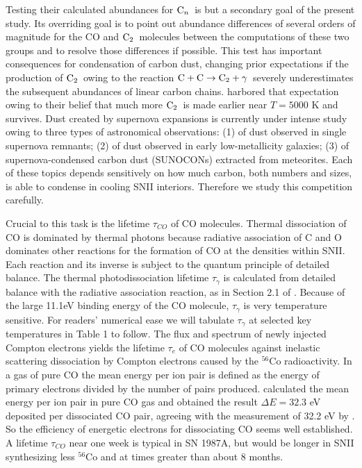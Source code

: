 \documentclass[manuscript]{aastex}
\newcommand{\ctwo}{{\rm C}_2}
\newcommand{\cenn}{{\rm C}_n}
\newcommand{\twoctoctwo}{${\rm C} + {\rm C} \to \ctwo + \gamma$}
\begin{document}
Testing their calculated abundances for $\cenn$\ is but a secondary 
goal of the present study. Its overriding goal is to point out 
abundance differences of several orders of magnitude for the CO 
and $\ctwo$\ molecules between the computations of these two groups 
and to resolve those differences if possible. This test has 
important consequences for condensation of carbon dust, changing 
prior expectations if the production of $\ctwo$\ owing to the reaction 
\twoctoctwo\ severely underestimates the subsequent abundances of 
linear carbon chains. \citet{2010ApJ...713....1C} harbored that 
expectation owing to their belief that much more $\ctwo$\ is 
made earlier near $T = 5000$ K and survives. Dust created by 
supernova expansions is currently under intense study owing to three 
types of astronomical observations: (1) of dust observed in single 
supernova remnants; (2) of dust observed in early low-metallicity 
galaxies; (3) of supernova-condensed carbon dust (SUNOCONs) 
extracted from meteorites. Each of these topics depends sensitively on 
how much carbon, both numbers and sizes, is able to condense in 
cooling SNII interiors. Therefore we study this competition carefully.

Crucial to this task is the lifetime $\tau_{CO}$ of CO molecules. 
Thermal dissociation of CO is dominated by thermal photons because 
radiative association of C and O dominates other reactions for 
the formation of CO at the densities within SNII. Each reaction 
and its inverse is subject to the quantum principle of detailed 
balance. The thermal photodissociation lifetime $\tau_\gamma$ is 
calculated from detailed balance with the radiative association reaction, as in 
Section 2.1 of \citet{2001ApJ...562..480C}. Because of the large 11.1eV 
binding energy of the CO molecule, $\tau_\gamma$ is very temperature sensitive. 
For readers’ numerical ease we will tabulate $\tau_\gamma$ at selected key 
temperatures in Table 1 to follow. The flux and spectrum of newly 
injected Compton electrons \citep{1991ApJ...375..221C} yields the 
lifetime $\tau_e$ of CO molecules against inelastic scattering dissociation by 
Compton electrons caused by the $^{56}$Co radioactivity. In a gas of pure 
CO the mean energy per ion pair is defined as the energy of primary 
electrons divided by the number of pairs produced. 
\citet{1994ApJ...435..909L} calculated the mean energy per ion pair 
in pure CO gas and obtained the result $\Delta E = 32.3$ eV deposited 
per dissociated CO pair, agreeing with the measurement of 32.2 eV 
by \citet{1968...Klots}. So the efficiency of energetic electrons for 
dissociating CO seems well established. A lifetime $\tau_{CO}$ near one 
week is typical in SN 1987A, but would be longer in SNII 
synthesizing less $^{56}$Co and at times greater than about 8 months.
\end{document}
